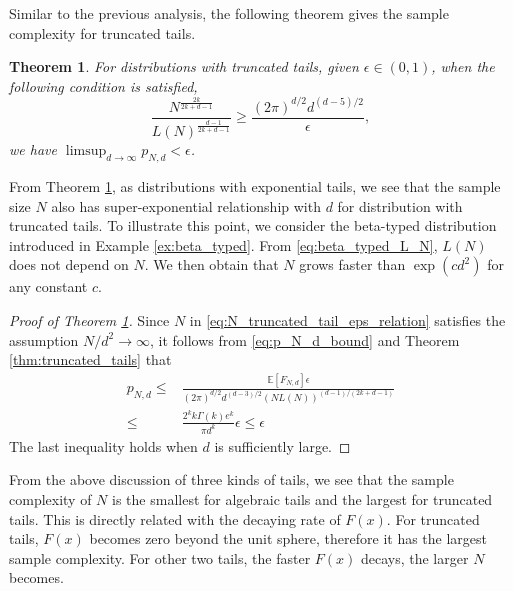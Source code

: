 \documentclass[conference,a4paper]{IEEEtran}
\def\E{\mathbb{E}}
\newtheorem{theorem}{Theorem}
\begin{document}
 Similar to the previous analysis,
 the following theorem gives the sample complexity for truncated tails.
 \begin{theorem}\label{thm:truncated_tails_sample}
  For distributions with truncated tails,
  given $\epsilon \in (0,1)$,
  when the following condition is satisfied,
  \begin{equation}\label{eq:N_truncated_tail_eps_relation}
    \frac{N^{\frac{2k}{2k+d-1}}}{L(N)^{\frac{d-1}{2k+d-1}}} 
         \geq \frac{(2\pi)^{d/2}d^{(d-5)/2}}{\epsilon},
  \end{equation}
  we have $ \limsup_{d\to \infty} p_{N,d} < \epsilon$.
\end{theorem}
From Theorem \ref{thm:truncated_tails_sample}, as
distributions with exponential tails, we see that
the sample size $N$ also has super-exponential relationship
with $d$ for distribution with truncated tails.
To illustrate this point, we consider the beta-typed distribution introduced
in Example \ref{ex:beta_typed}.
From \eqref{eq:beta_typed_L_N}, $L(N)$ does not depend on $N$.
We then obtain that $N$ grows faster than $\exp(cd^2)$ for any constant $c$.
\begin{proof}[Proof of Theorem \ref{thm:truncated_tails_sample}]
     Since $N$ in \eqref{eq:N_truncated_tail_eps_relation} satisfies the assumption $N/d^2 \to \infty$,
     it follows from \eqref{eq:p_N_d_bound} and Theorem \ref{thm:truncated_tails} that
     \begin{align*}
     p_{N,d} \leq &\frac{\E[F_{N,d}]\epsilon}{(2\pi)^{d/2} d^{(d-3)/2} (NL(N))^{(d-1)/(2k+d-1)}}\\
     \leq & \frac{2^k k\Gamma(k)e^k}{\pi d^k} \epsilon \leq \epsilon
     \end{align*}
     The last inequality holds when $d$ is sufficiently large.
\end{proof}
From the above discussion of three kinds of tails, we see that the sample complexity of $N$ is the smallest for algebraic tails and the largest
for truncated tails. This is directly related with the decaying rate of $F(x)$.
For truncated tails, $F(x)$ becomes zero beyond the unit sphere, therefore it has the largest sample complexity.
For other two tails, the faster $F(x)$ decays, the larger $N$ becomes.

\end{document}
